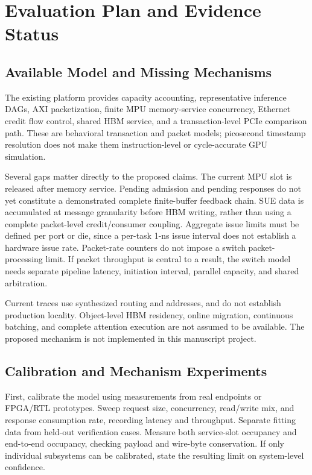 \section{Evaluation Plan and Evidence Status}
\subsection{Available Model and Missing Mechanisms}
The existing platform provides capacity accounting, representative
inference DAGs, AXI packetization, finite MPU memory-service concurrency,
Ethernet credit flow control, shared HBM service, and a transaction-level
PCIe comparison path. These are behavioral transaction and packet models;
picosecond timestamp resolution does not make them instruction-level or
cycle-accurate GPU simulation.

Several gaps matter directly to the proposed claims. The current MPU
slot is released after memory service. Pending admission and pending
responses do not yet constitute a demonstrated complete finite-buffer
feedback chain. SUE data is accumulated at message granularity before
HBM writing, rather than using a complete packet-level credit/consumer
coupling. Aggregate issue limits must be defined per port or die, since
a per-task 1-ns issue interval does not establish a hardware issue rate.
Packet-rate counters do not impose a switch packet-processing limit.
If packet throughput is central to a result, the switch model needs
separate pipeline latency, initiation interval, parallel capacity, and
shared arbitration.

Current traces use synthesized routing and addresses, and do not
establish production locality. Object-level HBM residency, online
migration, continuous batching, and complete attention execution are not
assumed to be available. The proposed mechanism is not implemented in
this manuscript project.

\subsection{Calibration and Mechanism Experiments}
First, calibrate the model using measurements from real endpoints or
FPGA/RTL prototypes. Sweep request size, concurrency, read/write mix,
and response consumption rate, recording latency and throughput.
Separate fitting data from held-out verification cases. Measure both
service-slot occupancy and end-to-end occupancy, checking payload and
wire-byte conservation. If only individual subsystems can be calibrated,
state the resulting limit on system-level confidence.


